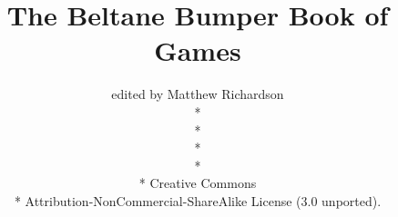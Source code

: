 


\documentclass[12pt,a4paper,titlepage,twoside,openright]{book}
\usepackage[latin1]{inputenc}
\usepackage{amsmath}
\usepackage{amsfonts}
\usepackage{amssymb}
\usepackage{multind}
\usepackage{fullpage}
\usepackage{verbatim}
\usepackage{cclicenses}
\author{edited by Matthew Richardson\\*
\\*
\\*
\\*
\cc \byncsa\\*
Creative Commons\\*
Attribution-NonCommercial-ShareAlike License (3.0 unported).}
\title{The Beltane Bumper Book of Games}
\date{}

\newcommand{\gamename}{}

\newcommand{\refer}[1]{\\*See also: \textbf{#1} (p.\pageref{#1})}

\makeatletter
\newcommand{\game}[2]{
\renewcommand{\gamename}{#1}
\@for \xx:=#2\do{
\index{Index}{\xx!{#1}}
}
\label{#1}
\section[#1]{#1}
\setlength{\parindent}{1.1em}
\textbf{Categories:}\indent #2\\*
\setlength{\parindent}{0em}
}
\makeatother


\makeatletter
\newcommand{\aka}[1]{
\@for \xy:=#1\do{
\index{Alternatives}{\xy!\gamename}
\textbf{Also Known As:} \xy\\*
}
}
\makeatother

\makeatletter
\newcommand{\equip}[1]{
\setlength{\parindent}{2.15em}
\textbf{Equipment:}
\@for \xy:=#1\do{
\xy\\*\indent\indent\indent
}
\setlength{\parindent}{0em}
}
\makeatother

